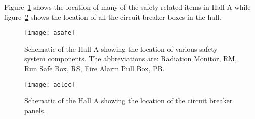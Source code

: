 Figure~\ref{fig:asafe} shows the location of
many of the safety related items in Hall A while
figure~\ref{fig:aelec} shows the location of all the circuit
breaker boxes in the hall.

\begin{figure}
\begin{center}
\texttt{[image: asafe]}
{\linespread{1.}
\caption[Introduction: Location of Hall Safety Items ]{Schematic
of the Hall A showing the location of various safety system
components. The abbreviations are: Radiation Monitor, RM, Run
Safe Box, RS, Fire Alarm Pull Box, PB. }
\label{fig:asafe}}
\end{center}
\end{figure}

\begin{figure}
\begin{center}
\texttt{[image: aelec]}
{\linespread{1.}
\caption[Introduction: Location of Circuit Breakers]{Schematic of
the Hall A showing the location of the circuit breaker panels.}
\label{fig:aelec}}
\end{center}
\end{figure}
%
%
%
%
